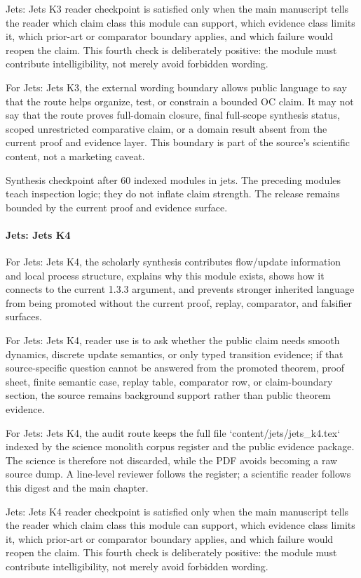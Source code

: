 Jets: Jets K3 reader checkpoint is satisfied only when the main manuscript tells the reader which claim class this module can support, which evidence class limits it, which prior-art or comparator boundary applies, and which failure would reopen the claim. This fourth check is deliberately positive: the module must contribute intelligibility, not merely avoid forbidden wording.


For Jets: Jets K3, the external wording boundary allows public language to say that the route helps organize, test, or constrain a bounded OC claim. It may not say that the route proves full-domain closure, final full-scope synthesis status, scoped unrestricted comparative claim, or a domain result absent from the current proof and evidence layer. This boundary is part of the source's scientific content, not a marketing caveat.


Synthesis checkpoint after 60 indexed modules in jets. The preceding modules teach inspection logic; they do not inflate claim strength. The release remains bounded by the current proof and evidence surface.


\paragraph{Jets: Jets K4}

For Jets: Jets K4, the scholarly synthesis contributes flow/update information and local process structure, explains why this module exists, shows how it connects to the current 1.3.3 argument, and prevents stronger inherited language from being promoted without the current proof, replay, comparator, and falsifier surfaces.


For Jets: Jets K4, reader use is to ask whether the public claim needs smooth dynamics, discrete update semantics, or only typed transition evidence; if that source-specific question cannot be answered from the promoted theorem, proof sheet, finite semantic case, replay table, comparator row, or claim-boundary section, the source remains background support rather than public theorem evidence.


For Jets: Jets K4, the audit route keeps the full file `content/jets/jets\_k4.tex` indexed by the science monolith corpus register and the public evidence package. The science is therefore not discarded, while the PDF avoids becoming a raw source dump. A line-level reviewer follows the register; a scientific reader follows this digest and the main chapter.


Jets: Jets K4 reader checkpoint is satisfied only when the main manuscript tells the reader which claim class this module can support, which evidence class limits it, which prior-art or comparator boundary applies, and which failure would reopen the claim. This fourth check is deliberately positive: the module must contribute intelligibility, not merely avoid forbidden wording.


